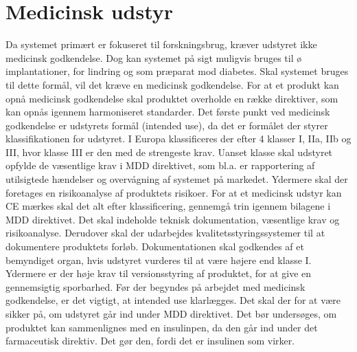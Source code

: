 \section{Medicinsk udstyr}
 Da systemet primært er fokuseret til forskningsbrug, kræver udstyret ikke medicinsk godkendelse. Dog kan systemet på sigt muligvis bruges til ø implantationer, for lindring og som præparat mod diabetes. Skal systemet bruges til dette formål, vil det kræve en medicinsk godkendelse. For at et produkt kan opnå medicinsk godkendelse skal produktet overholde en række direktiver, som kan opnås igennem harmoniseret standarder. Det første punkt ved medicinsk godkendelse er udstyrets formål (intended use), da det er formålet der styrer klassifikationen for udstyret. I Europa klassificeres der efter 4 klasser I, IIa, IIb og III, hvor klasse III er den med de strengeste krav. Uanset klasse skal udstyret opfylde de væsentlige krav i MDD direktivet, som bl.a. er rapportering af utilsigtede hændelser og overvågning af systemet på markedet. Ydermere skal der foretages en risikoanalyse af produktets risikoer. For at et medicinsk udstyr kan CE mærkes 
 skal det alt efter klassificering, gennemgå trin igennem bilagene i MDD direktivet. Det skal indeholde teknisk dokumentation, væsentlige krav og risikoanalyse. Derudover skal der udarbejdes kvalitetsstyringssystemer til at dokumentere produktets forløb. Dokumentationen skal godkendes af et bemyndiget organ, hvis udstyret vurderes til at være højere end klasse I. Ydermere er der høje krav til versionsstyring af produktet, for at give en gennemsigtig sporbarhed. Før der begyndes på arbejdet med medicinsk godkendelse, er det vigtigt, at intended use klarlægges. Det skal der for at være sikker på, om udstyret går ind under MDD direktivet. Det bør undersøges, om produktet kan sammenlignes med en insulinpen, da den går ind under det farmaceutisk direktiv. Det gør den, fordi det er insulinen som virker. 